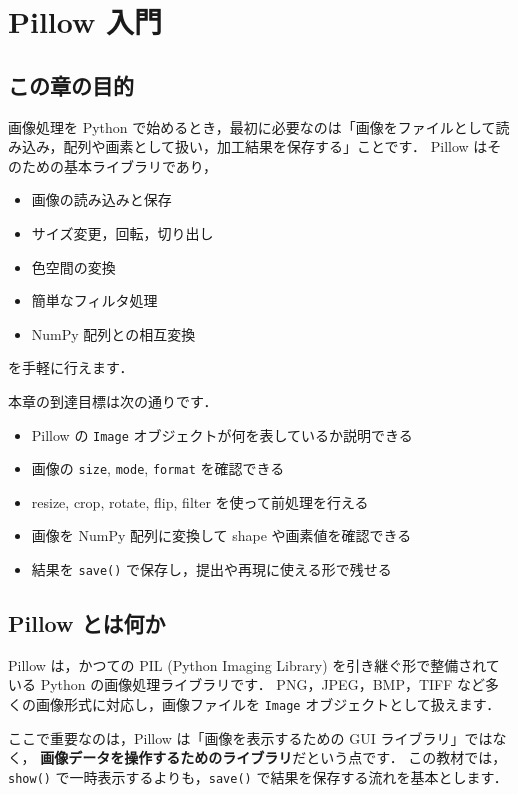 
\chapter{Pillow 入門}


\section{この章の目的}

画像処理を Python で始めるとき，最初に必要なのは「画像をファイルとして読み込み，配列や画素として扱い，加工結果を保存する」ことです．
Pillow はそのための基本ライブラリであり，
\begin{itemize}
\item 画像の読み込みと保存
\item サイズ変更，回転，切り出し
\item 色空間の変換
\item 簡単なフィルタ処理
\item NumPy 配列との相互変換
\end{itemize}
を手軽に行えます．

本章の到達目標は次の通りです．
\begin{itemize}
\item Pillow の \texttt{Image} オブジェクトが何を表しているか説明できる
\item 画像の \texttt{size}, \texttt{mode}, \texttt{format} を確認できる
\item resize, crop, rotate, flip, filter を使って前処理を行える
\item 画像を NumPy 配列に変換して shape や画素値を確認できる
\item 結果を \texttt{save()} で保存し，提出や再現に使える形で残せる
\end{itemize}


\section{Pillow とは何か}

Pillow は，かつての PIL (Python Imaging Library) を引き継ぐ形で整備されている Python の画像処理ライブラリです．
PNG，JPEG，BMP，TIFF など多くの画像形式に対応し，画像ファイルを \texttt{Image} オブジェクトとして扱えます．

ここで重要なのは，Pillow は「画像を表示するための GUI ライブラリ」ではなく，
\textbf{画像データを操作するためのライブラリ}だという点です．
この教材では，\texttt{show()} で一時表示するよりも，\texttt{save()} で結果を保存する流れを基本とします．


